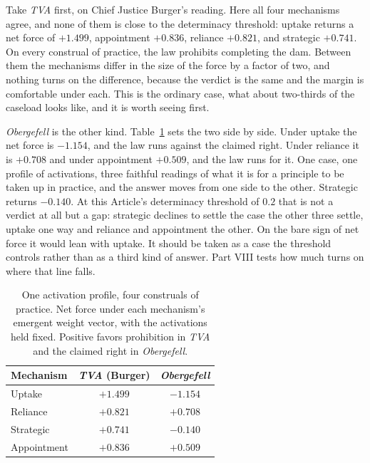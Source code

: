 Take \textit{TVA} first, on Chief Justice Burger's reading. Here all four mechanisms agree, and none of them is close to the determinacy
threshold: uptake returns a
net force of $+1.499$, appointment $+0.836$, reliance $+0.821$, and strategic
$+0.741$. On every construal of practice, the law prohibits completing the
dam. Between them the mechanisms differ in the size of the force by a factor of
two, and nothing turns on the difference, because the verdict is the same
and the margin is comfortable under each. This is the ordinary case, what about two-thirds of the caseload looks like,
and it is worth seeing first.

\textit{Obergefell} is the other kind. Table~\ref{tab:mechanism-cases}
sets the two side by side. Under uptake the net force is $-1.154$, and the law runs against the
claimed right. Under reliance it is $+0.708$ and under appointment
$+0.509$, and the law runs for it. One case, one profile of activations, three faithful readings of what it is for a
principle to be taken up in practice, and the answer moves from one side
to the other. Strategic returns $-0.140$. At this Article's determinacy threshold of $0.2$
that is not a verdict at all but a gap: strategic declines to settle the case
the other three settle, uptake one way and reliance and appointment the other. On the bare sign of net force it
would lean with uptake. It should be taken as a case the threshold controls
rather than as a third kind of answer. Part VIII tests how much turns on where that
line falls.

\begin{table}[t]
\centering
\small
\caption{One activation profile, four construals of practice. Net force
under each mechanism's emergent weight vector, with the activations held fixed. Positive favors prohibition in \textit{TVA} and
the claimed right in \textit{Obergefell}.}
\label{tab:mechanism-cases}
\begin{tabular}{lcc}
\toprule
\textbf{Mechanism} & \textbf{\textit{TVA} (Burger)} & \textbf{\textit{Obergefell}} \\
\midrule
Uptake      & $+1.499$ & $-1.154$ \\
Reliance    & $+0.821$ & $+0.708$ \\
Strategic   & $+0.741$ & $-0.140$ \\
Appointment & $+0.836$ & $+0.509$ \\
\bottomrule
\end{tabular}
\end{table}

